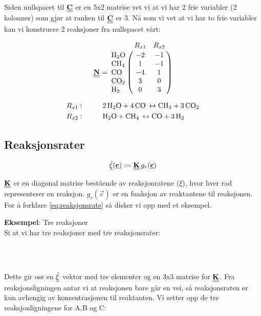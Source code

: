 Siden nullspacet til $\underline{\underline{\textbf{C}}}$ er en 5x2 matrise vet vi at vi har 2 frie variabler (2 kolonner) som gjør at ranken til $\underline{\underline{\textbf{C}}}$ er 3. Nå som vi vet at vi har to frie variabler kan vi konstruere 2 reaksjoner fra nullspacet vårt:

\begin{equation}
    \mymat{N} = 
    \bordermatrix{~ & R_{x1} & R_{x2}   \cr
                  \ce{H2O} & -2 & -1  \cr
                  \ce{CH4} & 1 & -1 \cr
                  \ce{CO} & -4 & 1 \cr
                  \ce{CO2} & 3 & 0 \cr
                  \ce{H2} & 0 & 3
                  }
\end{equation}

\begin{align*}
    R_{x1}:&\hspace{1cm} \ce{2H2O + 4CO \leftrightarrow CH4 + 3CO2} \\
    R_{x2}:&\hspace{1cm} \ce{H2O + CH4 \leftrightarrow CO + 3H2}
\end{align*}


\subsection{Reaksjonsrater}
\begin{equation}
    \label{eq:reaksjonsrate}
    \underline{\Tilde{\xi}}(\underline{\textbf{c}}) := \underline{\underline{\textbf{K}}}\,g_r(\underline{\textbf{c}})
\end{equation}

$\underline{\underline{\textbf{K}}}$ er en diagonal matrise bestående av reaksjonratene ($\xi$), hvor hver rad representerer en reaksjon. $g_r(\vec{c})$ er en funksjon av reaktantene til reaksjonen. For å forklare \cref{eq:reaksjonsrate} så disker vi opp med et eksempel. 

\textbf{Eksempel}: Tre reaksjoner\\
Si at vi har tre reaksjoner med tre reaksjonsrater:
\begin{center}
    \\
    \\
\end{center}

Dette gir oss en $\underline{\Tilde{\xi}}$ vektor med tre elementer og en 3x3 matrise for $\underline{\underline{\textbf{K}}}$. Fra reaksjonsligningen antar vi at reaksjonen bare går en vei, så reaksjonsraten er kun avhengig av konsentrasjonen til reaktanten. Vi setter opp de tre reaksjonligningene for A,B og C:

